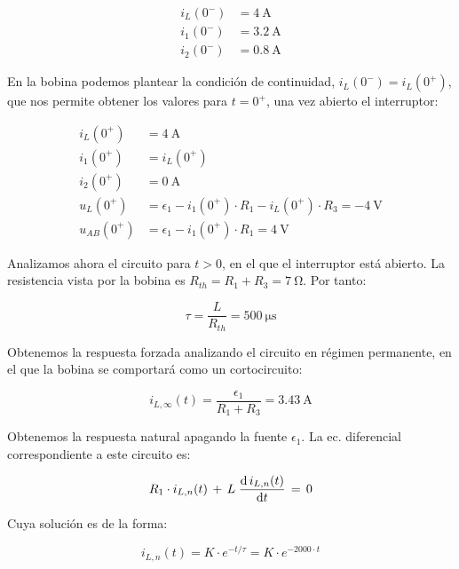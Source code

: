 \vspace{-4mm}
\begin{align*}
  i_L(0^-) &= \qty{4}{\ampere}\\
  i_1(0^-) &= \qty{3.2}{\ampere}\\
  i_2(0^-) &= \qty{0.8}{\ampere}
\end{align*}

En la bobina podemos plantear la condición de continuidad,
$i_L(0^-) = i_L(0^+)$, que nos permite obtener los valores para
$t = 0^+$, una vez abierto el interruptor:

\vspace{-4mm}
\begin{align*}
  i_L(0^+) &= \qty{4}{\ampere}\\
  i_1(0^+) &= i_L(0^+)\\
  i_2(0^+) &= \qty{0}{\ampere}\\
  u_L(0^+) &= \epsilon_1 - i_1(0^+) \cdot R_1 - i_L(0^+) \cdot R_3 = -\qty{4}{\volt}\\
  u_{AB}(0^+) &= \epsilon_1 - i_1(0^+) \cdot R_1 = \qty{4}{\volt}
\end{align*}

Analizamos ahora el circuito para $t > 0$, en el que el interruptor
está abierto. La resistencia vista por la bobina es
$R_{th} = R_1 + R_3 = \qty{7}{\ohm}$. Por tanto:

\begin{equation*}
  \tau = \frac{L}{R_{th}} = \qty{500}{\micro\second}
\end{equation*}

Obtenemos la respuesta forzada analizando el circuito en régimen
permanente, en el que la bobina se comportará como un cortocircuito:

\begin{equation*}
  i_{L,\infty}(t) = \frac{\epsilon_1}{R_1 + R_3} = \qty{3.43}{\ampere}
\end{equation*}

\vspace{2mm}
Obtenemos la respuesta natural apagando la fuente $\epsilon_1$. La ec. diferencial correspondiente a este circuito es:

\[
  R_1 \cdot i_{L,n}(t) \,+\, L \; \diff{\,i_{L,n}(t)}{t} \, = \,  0
\]

\vspace{2mm}
Cuya solución es de la forma:

\begin{equation*}
  i_{L,n}(t) = K \cdot e^{-t/\tau} = K \cdot e^{-2000 \cdot t}
\end{equation*}

